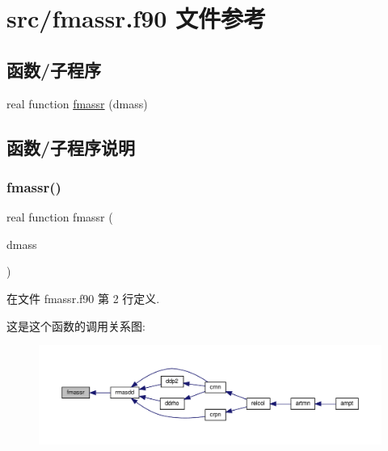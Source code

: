 \hypertarget{fmassr_8f90}{}\section{src/fmassr.f90 文件参考}
\label{fmassr_8f90}
\subsection*{函数/子程序}
\begin{DoxyCompactItemize}
\item 
real function \mbox{\hyperlink{fmassr_8f90_a749ed167e122d8f7581b5245e6d01cb9}{fmassr}} (dmass)
\end{DoxyCompactItemize}


\subsection{函数/子程序说明}
\mbox{\label{fmassr_8f90_a749ed167e122d8f7581b5245e6d01cb9}} 
\subsubsection{\texorpdfstring{fmassr()}{fmassr()}}
{\footnotesize\ttfamily real function fmassr (\begin{DoxyParamCaption}\item[{}]{dmass }\end{DoxyParamCaption})}



在文件 fmassr.\+f90 第 2 行定义.

这是这个函数的调用关系图\+:
\nopagebreak
\begin{figure}[H]
\begin{center}
\leavevmode
\includegraphics[width=350pt]{fmassr_8f90_a749ed167e122d8f7581b5245e6d01cb9_icgraph}
\end{center}
\end{figure}
